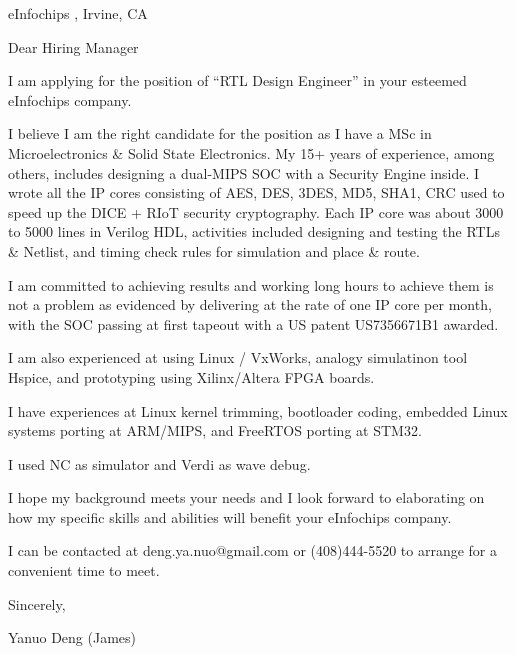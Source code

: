 eInfochips , Irvine, CA

{ 
Dear Hiring Manager
}

{ \bigbreak } 
I am applying for the position of ``RTL Design Engineer'' in your esteemed eInfochips company.

{ \bigbreak } 
I believe I am the right candidate for the position as I have a MSc in Microelectronics \& Solid State Electronics.
My 15+ years of experience, among others, 
includes designing a dual-MIPS SOC with a Security Engine inside. 
I wrote all the IP cores consisting of AES, DES, 3DES, MD5, SHA1, CRC 
used to speed up the DICE + RIoT security cryptography.
Each IP core was about 3000 to 5000 lines in Verilog HDL, 
activities included designing and testing the RTLs \& Netlist,
and timing check rules for simulation and place \& route.

{ \bigbreak } 
I am committed to achieving results and working long hours 
to achieve them is not a problem as evidenced by 
delivering at the rate of one IP core per month,
with the SOC passing at first tapeout
with a US patent US7356671B1 awarded.

{ \bigbreak } 
I am also experienced at using Linux / VxWorks, 
analogy simulatinon tool Hspice, 
and prototyping using Xilinx/Altera FPGA boards.

{ \bigbreak } 
I have experiences at Linux kernel trimming, bootloader coding, embedded Linux systems porting at ARM/MIPS, and FreeRTOS porting at STM32.

{ \bigbreak } 
I used NC as simulator and Verdi as wave debug. 

{ \bigbreak } 
I hope my background meets your needs and I look
forward to elaborating on how my specific skills and abilities will benefit your eInfochips company.

{ \bigbreak } 
I can be contacted at deng.ya.nuo@gmail.com
or (408)444-5520 to arrange for a convenient time to meet.

{ \bigbreak } 




\vskip 60pt

{ \bigbreak } 
Sincerely,

Yanuo Deng (James)

\bye
